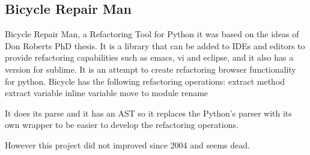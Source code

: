 \subsection{Bicycle Repair Man}

Bicycle Repair Man, a Refactoring Tool for Python it was based on the ideas of Don Roberts PhD thesis. It is a library that can be added to IDEs and editors to provide refactoring capabilities such as emacs, vi and eclipse, and it also has a version for sublime.
It is an attempt to create refactoring browser functionality for python. 
Bicycle has the following refactoring operations:
extract method
extract variable
inline variable
move to module
rename

It does its parse and it has an AST so it replaces the Python's parser with its own wrapper to be easier to develop the refactoring operations.

However this project did not improved since 2004 and seems dead.

